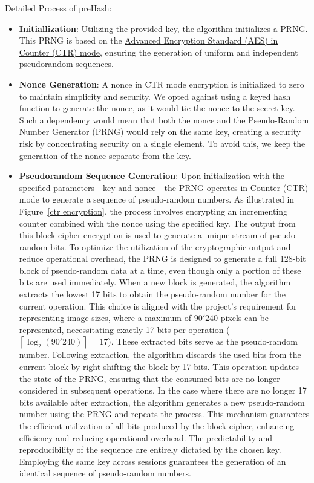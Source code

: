 Detailed Process of preHash:
\begin{itemize}
    \item \textbf{Initiallization}: Utilizing the provided key, the algorithm initializes a PRNG. This PRNG is based on the \hyperref[def:AES CTR mode]{Advanced Encryption Standard (AES) in Counter (CTR) mode}, ensuring the generation of uniform and independent pseudorandom sequences.

    \item \textbf{Nonce Generation}: A nonce in CTR mode encryption is initialized to zero to maintain simplicity and security. We opted against using a keyed hash function to generate the nonce, as it would tie the nonce to the secret key. Such a dependency would mean that both the nonce and the Pseudo-Random Number Generator (PRNG) would rely on the same key, creating a security risk by concentrating security on a single element. To avoid this, we keep the generation of the nonce separate from the key.

    \item \textbf{Pseudorandom Sequence Generation}: Upon initialization with the specified parameters—key and nonce—the PRNG operates in Counter (CTR) mode to generate a sequence of pseudo-random numbers. As illustrated in Figure~\ref{ctr encryption}, the process involves encrypting an incrementing counter combined with the nonce using the specified key. The output from this block cipher encryption is used to generate a unique stream of pseudo-random bits.
    To optimize the utilization of the cryptographic output and reduce operational overhead, the PRNG is designed to generate a full 128-bit block of pseudo-random data at a time, even though only a portion of these bits are used immediately. When a new block is generated, the algorithm extracts the lowest 17 bits to obtain the pseudo-random number for the current operation. This choice is aligned with the project's requirement for representing image sizes, where a maximum of \(90'240\) pixels can be represented, necessitating exactly 17 bits per operation (\(\left\lceil \log_2(90'240) \right\rceil = 17\)). These extracted bits serve as the pseudo-random number.
    Following extraction, the algorithm discards the used bits from the current block by right-shifting the block by 17 bits. This operation updates the state of the PRNG, ensuring that the consumed bits are no longer considered in subsequent operations. In the case where there are no longer 17 bits available after extraction, the algorithm generates a new pseudo-random number using the PRNG and repeats the process. This mechanism guarantees the efficient utilization of all bits produced by the block cipher, enhancing efficiency and reducing operational overhead.
    The predictability and reproducibility of the sequence are entirely dictated by the chosen key. Employing the same key across sessions guarantees the generation of an identical sequence of pseudo-random numbers.
    

\end{itemize}
